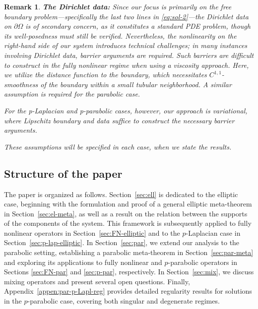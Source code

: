 \documentclass[11pt,oneside,english]{amsart}
\numberwithin{equation}{section}
\theoremstyle{plain}
\newtheorem{remark}{Remark}
\numberwithin{equation}{section}
\begin{document}
\medskip

\begin{remark}\label{rem:DirD}{\bf The Dirichlet data:} 
Since our focus is primarily on the free boundary problem—specifically the last two lines in \eqref{eq:sol-2}—the Dirichlet data on $\partial \Omega$ is of secondary concern, as it constitutes a standard PDE problem, though its well-posedness must still be verified. Nevertheless, the nonlinearity on the right-hand side of our system introduces technical challenges; in many instances involving Dirichlet data, barrier arguments are required. Such barriers are difficult to construct in the fully nonlinear regime when using a viscosity approach.
Here, we utilize the distance function to the boundary, which necessitates $C^{1,1}$-smoothness of the boundary within a small tubular neighborhood. A similar assumption is required for the parabolic case. 

For the p-Laplacian and p-parabolic cases, however, our approach is variational, where Lipschitz boundary and data suffice to construct the necessary barrier arguments.

These assumptions will be specified in each case, when we state the results.






 \end{remark}



\subsection{Structure of the paper}

The  paper is organized as follows. Section~\ref{sec:ell} is dedicated to the elliptic case, beginning with the formulation and proof of a general elliptic meta-theorem in Section~\ref{sec:el-meta}, as well as a result on the relation between the supports of the components of the system. 
This framework is subsequently applied to fully nonlinear operators in Section~\ref{sec:FN-elliptic} and to the $p$-Laplacian case in Section~\ref{sec:p-lap-elliptic}. In Section~\ref{sec:par}, we extend our analysis to the parabolic setting, establishing a parabolic meta-theorem in Section~\ref{sec:par-meta} and exploring its applications to fully nonlinear and $p$-parabolic operators in Sections \ref{sec:FN-par} and \ref{sec:p-par}, respectively. In Section~\ref{sec:mix}, we discuss mixing operators and present several open questions.
Finally, Appendix~\ref{appen:par-p-Lapl-reg} provides detailed regularity results for solutions in the $p$-parabolic case, covering both singular and degenerate regimes.
\end{document}
